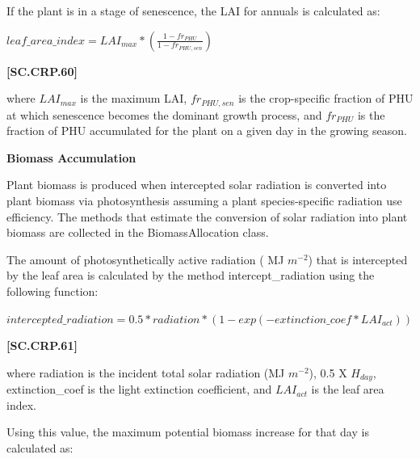 If the plant is in a stage of senescence, the LAI for annuals is calculated as:
   \vspace{0.2cm}

    \begin{center}
        \(leaf\_area\_index=LAI_{max} * (\frac{1-fr_{PHU}}{1-fr_{PHU,sen}})\) 
    \end{center}
        \vspace{0.5cm}
    
            {\raggedleft \textbf{[SC.CRP.60]}\par}
            \vspace{0.5cm}

where \(LAI_{max}\) is the maximum LAI, \(fr_{PHU,sen}\) is the crop-specific fraction of PHU at which senescence becomes the dominant growth process, and \(fr_{PHU}\) is the fraction of PHU accumulated for the plant on a given day in the growing season. 
\vspace{0.2cm}

\textbf{Biomass Accumulation}
\vspace{0.2cm}

Plant biomass is produced when intercepted solar radiation is converted into plant biomass via photosynthesis assuming a plant species-specific radiation use efficiency. The methods that estimate the conversion of solar radiation into plant biomass are collected in the BiomassAllocation class.

The amount of photosynthetically active radiation ( MJ \(m^{-2}\)) that is intercepted by the leaf area is calculated by the method intercept\_radiation using the following function:
   \vspace{0.2cm}

    \begin{center}
        \(intercepted\_radiation=0.5 * radiation * (1-exp(-extinction\_coef * LAI_{act}))\) 
    \end{center}
        \vspace{0.5cm}
    
            {\raggedleft \textbf{[SC.CRP.61]}\par}
            \vspace{0.5cm}

where radiation is the incident total solar radiation (MJ \(m^{-2}\)), 0.5 X \(H_{day}\), extinction\_coef  is the light extinction coefficient, and \(LAI_{act}\) is the leaf area index. 
 
Using this value, the maximum potential biomass increase for that day is calculated as:
   \vspace{0.2cm}


